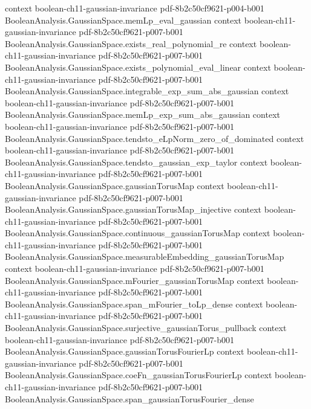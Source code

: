 \begin{theorem}
  {context}
  {boolean-ch11-gaussian-invariance}
  {pdf-8b2c50cf9621-p004-b001}
\proofstep
  {BooleanAnalysis.GaussianSpace.memLp_eval_gaussian}
  {context}
  {boolean-ch11-gaussian-invariance}
  {pdf-8b2c50cf9621-p007-b001}
\proofstep
  {BooleanAnalysis.GaussianSpace.exists_real_polynomial_re}
  {context}
  {boolean-ch11-gaussian-invariance}
  {pdf-8b2c50cf9621-p007-b001}
\proofstep
  {BooleanAnalysis.GaussianSpace.exists_polynomial_eval_linear}
  {context}
  {boolean-ch11-gaussian-invariance}
  {pdf-8b2c50cf9621-p007-b001}
\proofstep
  {BooleanAnalysis.GaussianSpace.integrable_exp_sum_abs_gaussian}
  {context}
  {boolean-ch11-gaussian-invariance}
  {pdf-8b2c50cf9621-p007-b001}
\proofstep
  {BooleanAnalysis.GaussianSpace.memLp_exp_sum_abs_gaussian}
  {context}
  {boolean-ch11-gaussian-invariance}
  {pdf-8b2c50cf9621-p007-b001}
\proofstep
  {BooleanAnalysis.GaussianSpace.tendsto_eLpNorm_zero_of_dominated}
  {context}
  {boolean-ch11-gaussian-invariance}
  {pdf-8b2c50cf9621-p007-b001}
\proofstep
  {BooleanAnalysis.GaussianSpace.tendsto_gaussian_exp_taylor}
  {context}
  {boolean-ch11-gaussian-invariance}
  {pdf-8b2c50cf9621-p007-b001}
\proofstep
  {BooleanAnalysis.GaussianSpace.gaussianTorusMap}
  {context}
  {boolean-ch11-gaussian-invariance}
  {pdf-8b2c50cf9621-p007-b001}
\proofstep
  {BooleanAnalysis.GaussianSpace.gaussianTorusMap_injective}
  {context}
  {boolean-ch11-gaussian-invariance}
  {pdf-8b2c50cf9621-p007-b001}
\proofstep
  {BooleanAnalysis.GaussianSpace.continuous_gaussianTorusMap}
  {context}
  {boolean-ch11-gaussian-invariance}
  {pdf-8b2c50cf9621-p007-b001}
\proofstep
  {BooleanAnalysis.GaussianSpace.measurableEmbedding_gaussianTorusMap}
  {context}
  {boolean-ch11-gaussian-invariance}
  {pdf-8b2c50cf9621-p007-b001}
\proofstep
  {BooleanAnalysis.GaussianSpace.mFourier_gaussianTorusMap}
  {context}
  {boolean-ch11-gaussian-invariance}
  {pdf-8b2c50cf9621-p007-b001}
\proofstep
  {BooleanAnalysis.GaussianSpace.span_mFourier_toLp_dense}
  {context}
  {boolean-ch11-gaussian-invariance}
  {pdf-8b2c50cf9621-p007-b001}
\proofstep
  {BooleanAnalysis.GaussianSpace.surjective_gaussianTorus_pullback}
  {context}
  {boolean-ch11-gaussian-invariance}
  {pdf-8b2c50cf9621-p007-b001}
\proofstep
  {BooleanAnalysis.GaussianSpace.gaussianTorusFourierLp}
  {context}
  {boolean-ch11-gaussian-invariance}
  {pdf-8b2c50cf9621-p007-b001}
\proofstep
  {BooleanAnalysis.GaussianSpace.coeFn_gaussianTorusFourierLp}
  {context}
  {boolean-ch11-gaussian-invariance}
  {pdf-8b2c50cf9621-p007-b001}
\proofstep
  {BooleanAnalysis.GaussianSpace.span_gaussianTorusFourier_dense}

\end{theorem}
